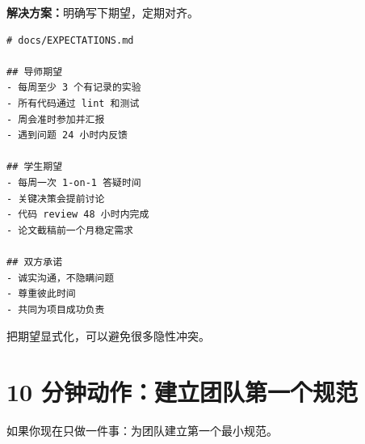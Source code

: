 \textbf{解决方案：}明确写下期望，定期对齐。

\begin{verbatim}
# docs/EXPECTATIONS.md

## 导师期望
- 每周至少 3 个有记录的实验
- 所有代码通过 lint 和测试
- 周会准时参加并汇报
- 遇到问题 24 小时内反馈

## 学生期望
- 每周一次 1-on-1 答疑时间
- 关键决策会提前讨论
- 代码 review 48 小时内完成
- 论文截稿前一个月稳定需求

## 双方承诺
- 诚实沟通，不隐瞒问题
- 尊重彼此时间
- 共同为项目成功负责
\end{verbatim}

把期望显式化，可以避免很多隐性冲突。

\section{10 分钟动作：建立团队第一个规范}

如果你现在只做一件事：为团队建立第一个最小规范。

